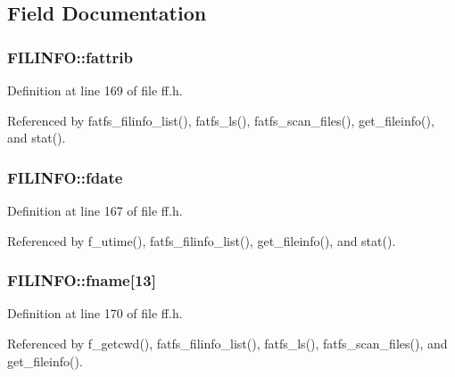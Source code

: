 \subsection{Field Documentation}
\hypertarget{structFILINFO_a838d542585831b085537b363f18205c0}{
\subsubsection[{fattrib}]{ F\-I\-L\-I\-N\-F\-O\-::fattrib}}\label{structFILINFO_a838d542585831b085537b363f18205c0}


Definition at line 169 of file ff.\-h.



Referenced by fatfs\-\_\-filinfo\-\_\-list(), fatfs\-\_\-ls(), fatfs\-\_\-scan\-\_\-files(), get\-\_\-fileinfo(), and stat().

\hypertarget{structFILINFO_a7c01c48a15b1b49da459924437b0bd52}{
\subsubsection[{fdate}]{ F\-I\-L\-I\-N\-F\-O\-::fdate}}\label{structFILINFO_a7c01c48a15b1b49da459924437b0bd52}


Definition at line 167 of file ff.\-h.



Referenced by f\-\_\-utime(), fatfs\-\_\-filinfo\-\_\-list(), get\-\_\-fileinfo(), and stat().

\hypertarget{structFILINFO_abd852510f2f79b4ec773156d8942dc7c}{
\subsubsection[{fname}]{ F\-I\-L\-I\-N\-F\-O\-::fname\mbox{[}13\mbox{]}}}\label{structFILINFO_abd852510f2f79b4ec773156d8942dc7c}


Definition at line 170 of file ff.\-h.



Referenced by f\-\_\-getcwd(), fatfs\-\_\-filinfo\-\_\-list(), fatfs\-\_\-ls(), fatfs\-\_\-scan\-\_\-files(), and get\-\_\-fileinfo().

